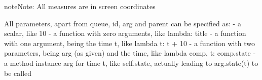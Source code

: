 \documentclass[letterpaper,10pt,english]{sphinxmanual}
\begin{document}
\begin{fulllineitems}
\begin{quote}
\begin{description}
\begin{itemize}
\end{itemize}

\end{description}\end{quote}

\begin{sphinxadmonition}{note}{Note:}
All measures are in screen coordinates 

All parameters, apart from queue, id, arg and parent can be specified as: 
- a scalar, like 10 
- a function with zero arguments, like lambda: title 
- a function with one argument, being the time t, like lambda t: t + 10 
- a function with two parameters, being arg (as given) and the time, like lambda comp, t: comp.state 
- a method instance arg for time t, like self.state, actually leading to arg.state(t) to be called
\end{sphinxadmonition}

\end{fulllineitems}

\end{document}
